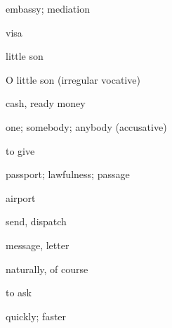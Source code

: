 \documentclass[avery5371,grid,frame]{flashcards}
\begin{document}
\begin{flashcard}{\LARGE embassy; mediation}
\LARGE {}
\end{flashcard}
\begin{flashcard}{\LARGE visa}
\LARGE {}
\end{flashcard}
\begin{flashcard}{\LARGE little son}
\LARGE {}
\end{flashcard}
\begin{flashcard}{\LARGE O little son (irregular vocative)}
\LARGE {}
\end{flashcard}
\begin{flashcard}{\LARGE cash, ready money}
\LARGE {}
\end{flashcard}
\begin{flashcard}{\LARGE one; somebody; anybody (accusative)}
\LARGE {}
\end{flashcard}
\begin{flashcard}{\LARGE to give}
\LARGE {}
\end{flashcard}
\begin{flashcard}{\LARGE passport; lawfulness; passage}
\LARGE {}
\end{flashcard}
\begin{flashcard}{\LARGE airport}
\LARGE {}
\end{flashcard}
\begin{flashcard}{\LARGE send, dispatch}
\LARGE {}
\end{flashcard}
\begin{flashcard}{\LARGE message, letter}
\LARGE {}
\end{flashcard}
\begin{flashcard}{\LARGE naturally, of course}
\LARGE {}
\end{flashcard}
\begin{flashcard}{\LARGE to ask}
\LARGE {}
\end{flashcard}
\begin{flashcard}{\LARGE quickly; faster}
\LARGE {}
\end{flashcard}
\end{document}
